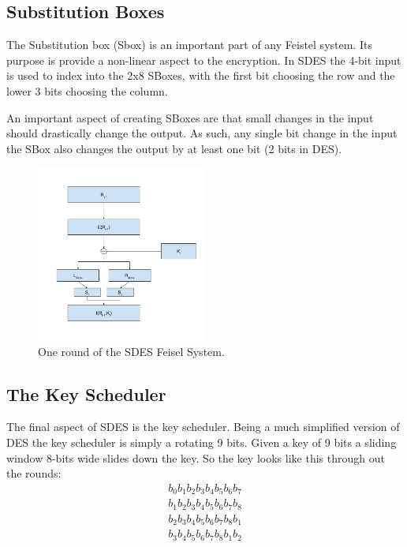 \subsection{ Substitution Boxes }
The Substitution box (Sbox) is an important part of any Feistel system.
Its purpose is provide a non-linear aspect to the encryption.
In SDES the 4-bit input is used to index into the 2x8 SBoxes, with the first bit choosing the row and the lower 3 bits choosing the column.

An important aspect of creating SBoxes are that small changes in the input should drastically change the output.
As such, any single bit change in the input the SBox also changes the output by at least one bit (2 bits in DES).

\begin{figure}[ht]
\begin{center}
\includegraphics[width=0.5\textwidth]{./fFunc}
\end{center}
\caption{ One round of the SDES Feisel System.}
\end{figure}

\subsection{The Key Scheduler}

The final aspect of SDES is the key scheduler.
Being a much simplified version of DES the key scheduler is simply a rotating 9 bits.
Given a key of 9 bits a sliding window 8-bits wide slides down the key.
So the key looks like this through out the rounds:
\begin{align}
b_0b_1b_2b_3b_4b_5b_6b_7 \\
b_1b_2b_3b_4b_5b_6b_7b_8 \\
b_2b_3b_4b_5b_6b_7b_8b_1 \\
b_3b_4b_5b_6b_7b_8b_1b_2
\end{align}

